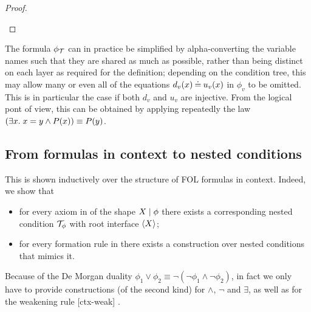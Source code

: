 \begin{proof}
\begin{description}


\end{description}
\end{proof}
%
The formula $\phi_{\mathcal{T}}$ can in practice be simplified by alpha-converting the variable names such that they are shared as much as possible, rather than being distinct on each layer as required for the definition; depending on the condition tree, this may allow many or even all of the equations $d_v(x)\mathbin{\doteq} u_v(x)$ in $\phi_v$ to be omitted. This is in particular the case if both $d_v$ and $u_v$ are injective. From the logical pont of view, this can be obtained by applying repeatedly the law $\left( \exists x .\; x = y \wedge P(x)\right) \equiv P(y)$.

\subsection{From formulas in context to nested conditions}

This is shown inductively over the structure of FOL formulas in context. Indeed, we show that 
\begin{itemize}
\item for every axiom in  of the shape ${X} \mid {\phi}$ there exists a corresponding {\proper} nested condition ${\mathcal{T}}_\phi$ with root interface $\langle X\rangle$;
\item for every formation rule in  there exists a construction over {\proper} nested conditions that mimics it.
\end{itemize}
%
%
Because of the De Morgan duality $\phi_1\vee \phi_2 \equiv \neg(\neg\phi_1\wedge \neg\phi_2)$, in fact we only have to provide constructions (of the second kind) for $\wedge$, $\neg$ and $\exists$, as well as for the weakening rule [ctx-weak] .

